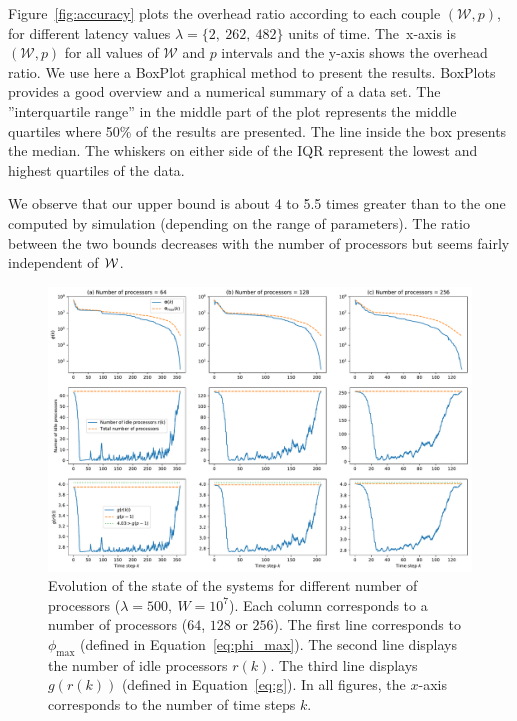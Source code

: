 Figure~\ref{fig:accuracy} plots the overhead ratio according to each
couple $(\mathcal{W}, p)$, for different latency values $\lambda= \{2,\ 262,\ 482\}$
units of time.
The~x-axis is $(\mathcal{W}, p)$ for all values of $\mathcal{W}$ and $p$ intervals
and the y-axis shows the overhead ratio.
We use here a BoxPlot graphical method to present the
results. BoxPlots provides a good overview and a numerical summary of a
data set.  The ''interquartile range'' in the middle part of the plot
represents the middle quartiles where 50\% of the results are
presented.  The line inside the box presents the median. The whiskers
on either side of the IQR represent the lowest and highest quartiles
of the data.  

We observe that our upper bound is about 4 to 5.5 times greater than
to the one computed by simulation (depending on the range of
parameters). The ratio between the two bounds decreases with the
number of processors but seems fairly independent of $\mathcal{W}$.


\begin{figure}[htb]
  \includegraphics[width=\linewidth]{figures/analysis.pdf}
  \caption{Evolution of the state of the systems for different
    number of processors ($\lambda=500,\ W=10^7$). Each column
    corresponds to a number of processors ($64$, $128$ or
    $256$).  The first line corresponds to $\phi_{\max}$
    (defined in Equation~\eqref{eq:phi_max}).  The second line
    displays the number of idle processors $r(k)$. The third
    line displays $g(r(k))$ (defined in
    Equation~\eqref{eq:g}). In all figures, the $x$-axis
    corresponds to the number of time steps $k$.}
  \label{fig:exp_analysis}
\end{figure}

